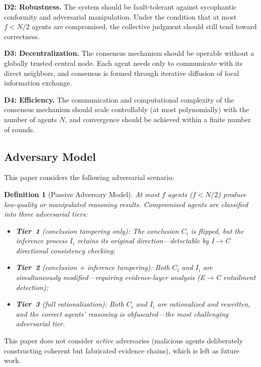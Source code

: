 \documentclass[12pt,a4paper]{article}
\newtheorem{definition}{Definition}[section]
\begin{document}
\textbf{D2: Robustness.} The system should be fault-tolerant against sycophantic conformity and adversarial manipulation. Under the condition that at most $f < N/2$ agents are compromised, the collective judgment should still tend toward correctness.

\textbf{D3: Decentralization.} The consensus mechanism should be operable without a globally trusted central node. Each agent needs only to communicate with its direct neighbors, and consensus is formed through iterative diffusion of local information exchange.

\textbf{D4: Efficiency.} The communication and computational complexity of the consensus mechanism should scale controllably (at most polynomially) with the number of agents $N$, and convergence should be achieved within a finite number of rounds.

\subsection{Adversary Model}

This paper considers the following adversarial scenario:

\begin{definition}[Passive Adversary Model]\label{def:adversary}
At most $f$ agents ($f < N/2$) produce low-quality or manipulated reasoning results. Compromised agents are classified into three adversarial tiers:
\begin{itemize}[nosep]
    \item \textbf{Tier~1} (conclusion tampering only): The conclusion $C_i$ is flipped, but the inference process $I_i$ retains its original direction---detectable by I$\to$C directional consistency checking;
    \item \textbf{Tier~2} (conclusion + inference tampering): Both $C_i$ and $I_i$ are simultaneously modified---requiring evidence-layer analysis (E$\to$C entailment detection);
    \item \textbf{Tier~3} (full rationalization): Both $C_i$ and $I_i$ are rationalized and rewritten, and the correct agents' reasoning is obfuscated---the most challenging adversarial tier.
\end{itemize}
\end{definition}

This paper does not consider \textit{active} adversaries (malicious agents deliberately constructing coherent but fabricated evidence chains), which is left as future work.

\end{document}
